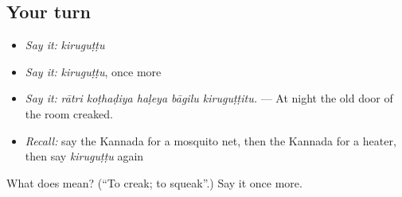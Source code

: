 \subsection*{Your turn}
\begin{itemize}
\raggedright
  \item \emph{Say it:} \emph{kiruguṭṭu}
  \item \emph{Say it:} \emph{kiruguṭṭu}, once more
  \item \emph{Say it:} \emph{rātri koṭhaḍiya haḷeya bāgilu kiruguṭṭitu.} — At night the old door of the room creaked.
  \item \emph{Recall:} say the Kannada for a mosquito net, then the Kannada for a heater, then say \emph{kiruguṭṭu} again
\end{itemize}

\begin{tcolorbox}[breakable,colback=teal!4,colframe=teal!35!black,title={Before you move on}]
What does  mean? (\textquotedblleft{}To creak; to squeak\textquotedblright{}.) Say it once more.
\end{tcolorbox}
